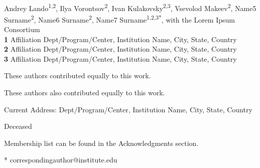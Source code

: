 \documentclass[10pt,letterpaper]{article}
\begin{document}
\vspace*{0.2in}

\begin{flushleft}
{\Large
\textbf{} %
}
\newline
\\
Andrey Lando\textsuperscript{1,2\Yinyang},
Ilya Vorontsov\textsuperscript{2\Yinyang},
Ivan Kulakovsky\textsuperscript{2,3\textcurrency},
Vsevolod Makeev\textsuperscript{2},
Name5 Surname\textsuperscript{2\ddag},
Name6 Surname\textsuperscript{2\ddag},
Name7 Surname\textsuperscript{1,2,3*},
with the Lorem Ipsum Consortium\textsuperscript{\textpilcrow}
\\
\bigskip
\textbf{1} Affiliation Dept/Program/Center, Institution Name, City, State, Country
\\
\textbf{2} Affiliation Dept/Program/Center, Institution Name, City, State, Country
\\
\textbf{3} Affiliation Dept/Program/Center, Institution Name, City, State, Country
\\
\bigskip

% 
%
\Yinyang These authors contributed equally to this work.

\ddag These authors also contributed equally to this work.

\textcurrency Current Address: Dept/Program/Center, Institution Name, City, State, Country %

\dag Deceased

\textpilcrow Membership list can be found in the Acknowledgments section.

* correspondingauthor@institute.edu

\end{flushleft}
\end{document}
